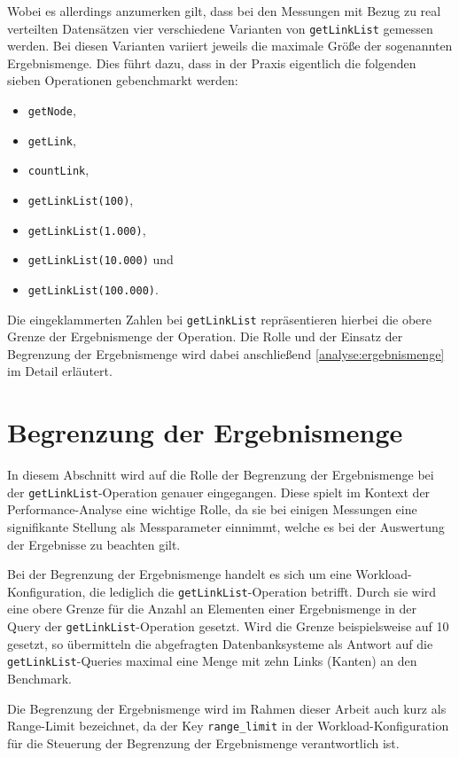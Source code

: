 Wobei es allerdings anzumerken gilt, dass bei den Messungen mit Bezug zu real verteilten Datensätzen vier verschiedene Varianten von \texttt{getLinkList} gemessen werden. Bei diesen Varianten variiert jeweils die maximale Größe der sogenannten Ergebnismenge. Dies führt dazu, dass in der Praxis eigentlich die folgenden sieben Operationen gebenchmarkt werden:
\begin{itemize}
    \item \texttt{getNode},
    \item \texttt{getLink},
    \item \texttt{countLink},
    \item \texttt{getLinkList(100)},
    \item \texttt{getLinkList(1.000)},
    \item \texttt{getLinkList(10.000)} und
    \item \texttt{getLinkList(100.000)}.
\end{itemize}
Die eingeklammerten Zahlen bei \texttt{getLinkList} repräsentieren hierbei die obere Grenze der Ergebnismenge der Operation. Die Rolle und der Einsatz der Begrenzung der Ergebnismenge wird dabei anschließend \autoref{analyse:ergebnismenge} im Detail erläutert. 

\section{Begrenzung der Ergebnismenge}
\label{analyse:ergebnismenge}
In diesem Abschnitt wird auf die Rolle der Begrenzung der Ergebnismenge bei der \texttt{getLinkList}-Ope\-ra\-ti\-on genauer eingegangen. Diese spielt im Kontext der Performance-Analyse eine wichtige Rolle, da sie bei einigen Messungen eine signifikante Stellung als Messparameter einnimmt, welche es bei der Auswertung der Ergebnisse zu beachten gilt. 

Bei der Begrenzung der Ergebnismenge handelt es sich um eine Workload-Konfiguration, die lediglich die \texttt{getLinkList}-Ope\-ra\-ti\-on betrifft. Durch sie wird eine obere Grenze für die Anzahl an Elementen einer Ergebnismenge in der Query der \texttt{getLinkList}-Ope\-ra\-ti\-on gesetzt. Wird die Grenze beispielsweise auf 10 gesetzt, so übermitteln die abgefragten Datenbanksysteme als Antwort auf die \texttt{getLinkList}-Queries maximal eine Menge mit zehn Links (Kanten) an den Benchmark. 

Die Begrenzung der Ergebnismenge wird im Rahmen dieser Arbeit auch kurz als Range-Limit bezeichnet, da der Key \texttt{range\_limit} in der Workload-Konfiguration für die Steuerung der Begrenzung der Ergebnismenge verantwortlich ist. 

